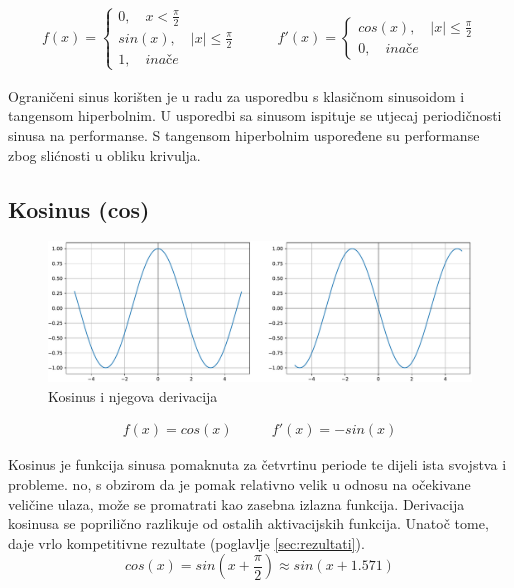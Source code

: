\documentclass[times, utf8, numeric, diplomski]{fer}
\def\otherwise{\textit{inače}}
\begin{document}
\begin{equation}
\label{eq:trsin}
\begin{split}
f(x) =
\begin{cases}
0, \quad x < \frac{\pi}{2} \\
sin(x), \quad |x| \leq \frac{\pi}{2} \\
1, \quad \otherwise
\end{cases}
\end{split}
\qquad
\begin{split}
f'(x) =
\begin{cases}
cos(x), \quad |x| \leq \frac{\pi}{2} \\
0, \quad \otherwise
\end{cases}
\end{split}
\end{equation}

Ograničeni sinus korišten je u radu \citet{taming_waves} za usporedbu s klasičnom sinusoidom i tangensom hiperbolnim. U usporedbi sa sinusom ispituje se utjecaj periodičnosti sinusa na performanse. S tangensom hiperbolnim uspoređene su performanse zbog slićnosti u obliku krivulja.

\subsection{Kosinus (cos)}

\begin{figure}[H]
\includegraphics[width=\textwidth]{Cos.pdf}
\centering
\caption{Kosinus i njegova derivacija}
\label{fig:cos}
\end{figure}

\begin{equation}
\label{eq:cos}
\begin{split}
f(x) = cos(x)
\end{split}
\qquad
\begin{split}
f'(x) = -sin(x)
\end{split}
\end{equation}

Kosinus je funkcija sinusa pomaknuta za četvrtinu periode te dijeli ista svojstva i probleme. no, s obzirom da je pomak relativno velik u odnosu na očekivane veličine ulaza, može se promatrati kao zasebna izlazna funkcija. Derivacija kosinusa se poprilično razlikuje od ostalih aktivacijskih funkcija. Unatoč tome, daje vrlo kompetitivne rezultate (poglavlje \ref{sec:rezultati}).
\begin{equation}
cos(x) = sin(x + \frac{\pi}{2}) \approx sin(x + 1.571)
\end{equation}
\end{document}
